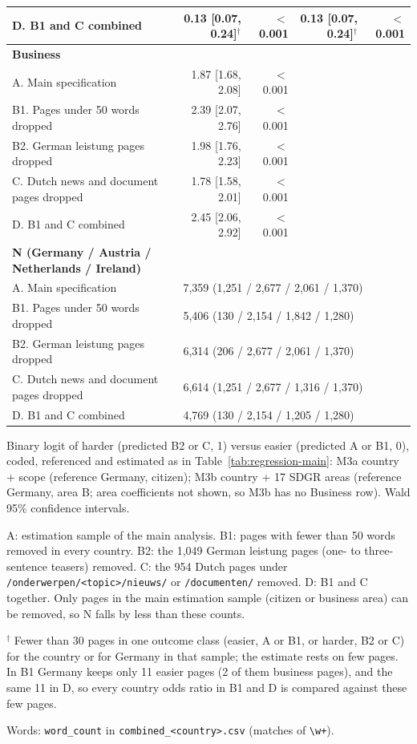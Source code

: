 \begin{table}[htbp]
\begin{threeparttable}
\begin{tabular}{lrrrr}
\quad D. B1 and C combined & 0.13 [0.07, 0.24]$^\dagger$ & $<$0.001 & 0.13 [0.07, 0.24]$^\dagger$ & $<$0.001 \\
\hline
\textbf{Business} &  &  &  &  \\
\quad A. Main specification & 1.87 [1.68, 2.08] & $<$0.001 &  &  \\
\quad B1. Pages under 50 words dropped & 2.39 [2.07, 2.76] & $<$0.001 &  &  \\
\quad B2. German leistung pages dropped & 1.98 [1.76, 2.23] & $<$0.001 &  &  \\
\quad C. Dutch news and document pages dropped & 1.78 [1.58, 2.01] & $<$0.001 &  &  \\
\quad D. B1 and C combined & 2.45 [2.06, 2.92] & $<$0.001 &  &  \\
\hline
\textbf{N (Germany / Austria / Netherlands / Ireland)} &  &  &  &  \\
\quad A. Main specification & \multicolumn{4}{l}{7,359 (1,251 / 2,677 / 2,061 / 1,370)} \\
\quad B1. Pages under 50 words dropped & \multicolumn{4}{l}{5,406 (130 / 2,154 / 1,842 / 1,280)} \\
\quad B2. German leistung pages dropped & \multicolumn{4}{l}{6,314 (206 / 2,677 / 2,061 / 1,370)} \\
\quad C. Dutch news and document pages dropped & \multicolumn{4}{l}{6,614 (1,251 / 2,677 / 1,316 / 1,370)} \\
\quad D. B1 and C combined & \multicolumn{4}{l}{4,769 (130 / 2,154 / 1,205 / 1,280)} \\
\hline
\end{tabular}
\begin{tablenotes}
\footnotesize
\item Binary logit of harder (predicted B2 or C, 1) versus easier (predicted A or B1, 0), coded, referenced and estimated as in Table~\ref{tab:regression-main}: M3a country + scope (reference Germany, citizen); M3b country + 17 SDGR areas (reference Germany, area B; area coefficients not shown, so M3b has no Business row). Wald 95\% confidence intervals.
\item A: estimation sample of the main analysis. B1: pages with fewer than 50 words removed in every country. B2: the 1,049 German leistung pages (one- to three-sentence teasers) removed. C: the 954 Dutch pages under \texttt{/onderwerpen/<topic>/nieuws/} or \texttt{/documenten/} removed. D: B1 and C together. Only pages in the main estimation sample (citizen or business area) can be removed, so N falls by less than these counts.
\item $^\dagger$ Fewer than 30 pages in one outcome class (easier, A or B1, or harder, B2 or C) for the country or for Germany in that sample; the estimate rests on few pages. In B1 Germany keeps only 11 easier pages (2 of them business pages), and the same 11 in D, so every country odds ratio in B1 and D is compared against these few pages.
\item Words: \texttt{word\_count} in \texttt{combined\_<country>.csv} (matches of \texttt{\textbackslash w+}).
\end{tablenotes}
\end{threeparttable}
\end{table}
